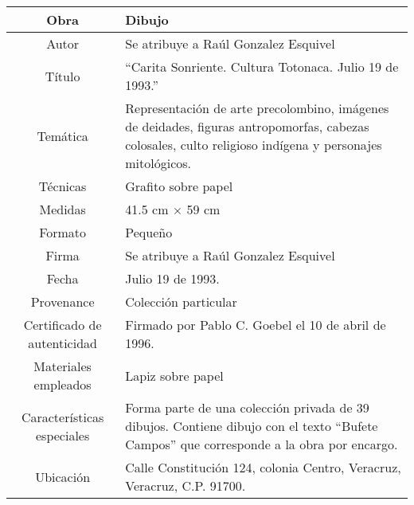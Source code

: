 \documentclass[10pt,letter]{report}
\begin{document}
\begin{table}[H]
\centering
\begin{tabular}{|c|m{}|}
\hline
Obra& Dibujo	\\
\hline
Autor & Se atribuye a Ra\'ul Gonzalez Esquivel\\
\hline
T\'itulo & ``Carita Sonriente. Cultura Totonaca. Julio 19 de 1993.'' \\
\hline
Tem\'atica & Representaci\'on de arte precolombino, im\'agenes de deidades, figuras antropomorfas, cabezas colosales, culto religioso ind\'igena y personajes mitol\'ogicos.\\
\hline
T\'ecnicas &Grafito sobre papel \\
\hline
Medidas & 41.5 cm $\times$ 59 cm \\
\hline
 Formato & Peque\~no \\
 \hline
 Firma & Se atribuye a Ra\'ul Gonzalez Esquivel\\ 
 \hline
  Fecha & Julio 19 de 1993.\\
 \hline
 Provenance & Colecci\'on particular\\
 \hline
 Certificado de autenticidad& Firmado por Pablo C. Goebel el 10 de abril de 1996.  \\
 \hline 
  Materiales empleados & Lapiz sobre papel\\
 \hline
 Caracter\'isticas especiales & Forma parte de una colecci\'on privada de 39 dibujos. 
Contiene dibujo con el texto ``Bufete Campos'' que corresponde a la obra por encargo. \\
\hline 
Ubicaci\'on & Calle Constituci\'on 124, colonia Centro, Veracruz, Veracruz, C.P. 91700.\\
\hline

\end{tabular}
\end{table}
\end{document}
